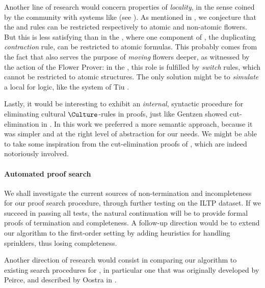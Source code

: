 Another line of research would concern properties of \emph{locality}, in the
sense coined by the  community with systems like  (see
). As mentioned in , we
conjecture that the  and  rules can be restricted
respectively to atomic and non-atomic flowers. But this is less satisfying than
in the , where one component of , the
duplicating \emph{contraction} rule, can be restricted to atomic formulas. This
probably comes from the fact that  also serves the purpose of
\emph{moving} flowers deeper, as witnessed by the   action of
the Flower Prover: in the , this role is fulfilled by
\emph{switch} rules, which cannot be restricted to atomic structures. The only
solution might be to \emph{simulate} a local  for
 logic, like the system  of Tiu
.

Lastly, it would be interesting to exhibit an \emph{internal}, syntactic
procedure for eliminating cultural $\Culture$-rules in proofs, just like Gentzen
showed cut-elimination in . In this work we preferred a more
semantic approach, because it was simpler and at the right level of abstraction
for our needs. We might be able to take some inspiration from the
cut-elimination proofs of , which are indeed notoriously
involved.

\paragraph{Automated proof search}

We shall investigate the current sources of non-termination and incompleteness
for our  proof search procedure, through further testing on the
ILTP dataset. If we succeed in passing all tests, the natural continuation will
be to provide formal proofs of termination and completeness. A follow-up
direction would be to extend our algorithm to the first-order setting by adding
heuristics for handling sprinklers, thus losing completeness.

Another direction of research would consist in comparing our algorithm to
existing search procedures for , in particular one that was originally
developed by Peirce, and described by Oostra in .

